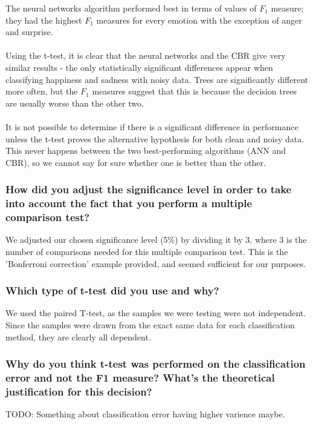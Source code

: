 \documentclass[12pt]{article}
\begin{document}
The neural networks algorithm performed best in terms of values of $F_1$ measure; they had the highest $F_1$ measures for every emotion with the exception of anger and surprise. \\ \\
Using the t-test, it is clear that the neural networks and the CBR give very similar results - the only statistically significant differences appear when classifying happiness and sadness with noisy data. Trees are significantly different more often, but the $F_1$ measures suggest that this is because the decision trees are usually worse than the other two. \\ \\
It is not possible to determine if there is a significant difference in performance unless the t-test proves the alternative hypothesis for both clean and noisy data. This never happens between the two best-performing algorithms (ANN and CBR), so we cannot say for sure whether one is better than the other.

\subsubsection*{How did you adjust the significance level in order to take into account the fact that you perform a multiple comparison test?}

We adjusted our chosen significance level (5\%) by dividing it by 3, where 3 is the number of comparisons needed for this multiple comparison test. This is the 'Bonferroni correction' example provided, and seemed sufficient for our purposes.

\subsubsection*{Which type of t-test did you use and why?}

We used the paired T-test, as the samples we were testing were not independent. Since the samples were drawn from the exact same data for each classification method, they are clearly all dependent.

\subsubsection*{Why do you think t-test was performed on the classification error and not the F1 measure? What's the theoretical justification for this decision?}

TODO: Something about classification error having higher varience maybe.
\end{document}
